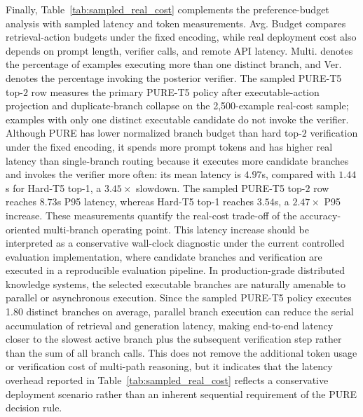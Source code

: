 \documentclass[a4paper,fleqn]{cas-dc}
\begin{document}
Finally, Table~\ref{tab:sampled_real_cost} complements the preference-budget analysis with sampled latency and token measurements. Avg. Budget compares retrieval-action budgets under the fixed encoding, while real deployment cost also depends on prompt length, verifier calls, and remote API latency. Multi. denotes the percentage of examples executing more than one distinct branch, and Ver. denotes the percentage invoking the posterior verifier. The sampled PURE-T5 top-$2$ row measures the primary PURE-T5 policy after executable-action projection and duplicate-branch collapse on the 2,500-example real-cost sample; examples with only one distinct executable candidate do not invoke the verifier. Although PURE has lower normalized branch budget than hard top-$2$ verification under the fixed encoding, it spends more prompt tokens and has higher real latency than single-branch routing because it executes more candidate branches and invokes the verifier more often: its mean latency is $4.97$s, compared with $1.44$s for Hard-T5 top-1, a $3.45\times$ slowdown. The sampled PURE-T5 top-$2$ row reaches $8.73$s P95 latency, whereas Hard-T5 top-1 reaches $3.54$s, a $2.47\times$ P95 increase. These measurements quantify the real-cost trade-off of the accuracy-oriented multi-branch operating point. This latency increase should be interpreted as a conservative wall-clock diagnostic under the current controlled evaluation implementation, where candidate branches and verification are executed in a reproducible evaluation pipeline. In production-grade distributed knowledge systems, the selected executable branches are naturally amenable to parallel or asynchronous execution. Since the sampled PURE-T5 policy executes 1.80 distinct branches on average, parallel branch execution can reduce the serial accumulation of retrieval and generation latency, making end-to-end latency closer to the slowest active branch plus the subsequent verification step rather than the sum of all branch calls. This does not remove the additional token usage or verification cost of multi-path reasoning, but it indicates that the latency overhead reported in Table~\ref{tab:sampled_real_cost} reflects a conservative deployment scenario rather than an inherent sequential requirement of the PURE decision rule.
\end{document}
